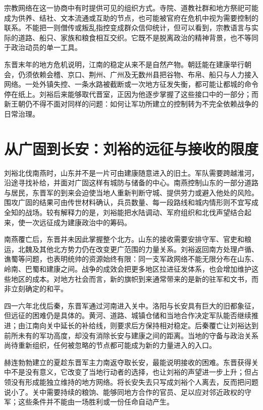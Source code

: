 宗教网络在这一协商中有时提供可见的组织方式。寺院、道教社群和地方祭祀可能成为供养、结社、文本流通或互助的节点，也可能被官府在危机中视为需要控制的联系。不能把一则僧传或叛乱指控变成群众信仰统计，但可以看到，宗教语言与实际的道路、船只、家族和粮食相互交织。它既不是脱离政治的精神背景，也不等同于政治动员的单一工具。

东晋末年的地方危机说明，江南的稳定从来不是自然产物。朝廷能在建康举行朝会，仍须依赖会稽、京口、荆州、广州及无数州县把谷物、布帛、船只与人力接入网络。一处外镇失控、一条水路被截断或一次地方征发失衡，都可能让都城的命令停在纸上。刘裕后来能够取代晋室，正因为他逐步掌握了这些接口中的一部分；而新王朝仍不得不面对同样的问题：如何让军功所建立的控制转为不完全依赖战争的日常治理。

\section{从广固到长安：刘裕的远征与接收的限度}
\label{sec:eastern-jin-depth-liuyu-campaigns}

刘裕北伐南燕时，山东并不是一片可由建康随意进入的旧土。军队需要跨越淮河，沿途寻找补给，并面对广固这样有城防与储备的中心。南燕控制山东的一部分道路与居民，东晋军的到来会迫使当地人重新判断守城、提供劳力或避入他处的风险。围攻广固的结果可由传世材料确认，兵员数量、每一段路线和城内情形则不宜写成全知的战场。较有解释力的是，刘裕能把水陆调动、军府组织和北伐声望结合起来，使一次远征成为建康政治中的筹码。

南燕覆亡后，东晋并未因此掌握整个北方。山东的接收需要安排守军、官吏和粮运，北魏及其他北方势力仍在改变更广范围的力量关系。刘裕返回南方处理卢循、谯蜀等问题，也表明统帅的资源始终有限：同一支军政网络不能无限分布在山东、岭南、巴蜀和建康之间。战争的成效会把更多地区拉进征发体系，也会增加维护这些地区的成本。对地方社会而言，新的旗帜到来通常带来的是新的驻军和文书，而非立刻确定的和平。

四一六年北伐后秦，东晋军通过河南进入关中。洛阳与长安具有巨大的旧都象征，但远征的困难仍是具体的。黄河、道路、城镇仓储和当地合作决定军队能否继续推进；由江南向关中延长的补给线，则要求后方保持相对稳定。后秦覆亡让刘裕达到前所未有的军功高度，却没有消除长安与建康之间的距离。当地的守备与政治关系尚待重新组织，任何被忽略的节点都可能成为新的力量进入的入口。

赫连勃勃建立的夏趁东晋军主力南返夺取长安，最能说明接收的困难。东晋获得关中不是没有意义，它改变了当地行动者的选择，也让刘裕的声望进一步上升；但占领没有形成能独立维持的地方网络。将长安失去只写成刘裕个人离去，反而把问题说小了。关中需要持续的粮饷、能够同地方合作的官员、足以应对邻近政权的守军；这些条件并不能由一场胜利或一份任命自动产生。

